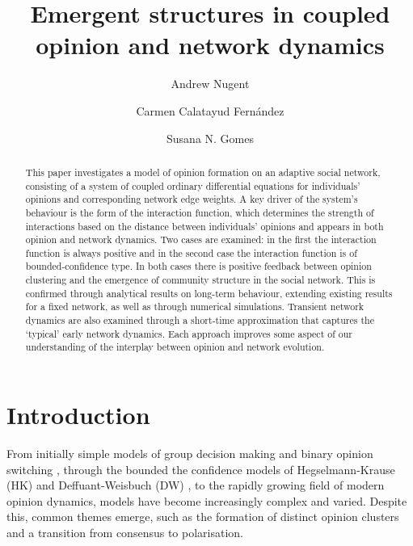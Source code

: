 \documentclass{article}
\title{Emergent structures in coupled opinion and network dynamics}
\author[1,2]{Andrew Nugent}
\author[3]{Carmen Calatayud Fern\'andez}
\author[2]{Susana N. Gomes}
\affil[1]{Department of Mathematics, University College London}
\affil[2]{Mathematics Institute, University of Warwick}
\affil[3]{Department of Physics, University of Warwick}
\begin{document}
\maketitle

\begin{abstract}
    This paper investigates a model of opinion formation on an adaptive social network, consisting of a system of coupled ordinary differential equations for individuals' opinions and corresponding network edge weights. A key driver of the system's behaviour is the form of the interaction function, which determines the strength of interactions based on the distance between individuals' opinions and appears in both opinion and network dynamics. Two cases are examined: in the first the interaction function is always positive and in the second case the interaction function is of bounded-confidence type. In both cases there is positive feedback between opinion clustering and the emergence of community structure in the social network. This is confirmed through analytical results on long-term behaviour, extending existing results for a fixed network, as well as through numerical simulations. Transient network dynamics are also examined through a short-time approximation that captures the `typical' early network dynamics. Each approach improves some aspect of our understanding of the interplay between opinion and network evolution. 
\end{abstract}

\tableofcontents

\newpage

\section{Introduction} \label{Section: Introduction}

From initially simple models of group decision making \cite{degroot1974reaching} and binary opinion switching \cite{liggett1985interacting}, through the bounded the confidence models of Hegselmann-Krause (HK) \cite{hegselmann2002opinion} and Deffuant-Weisbuch (DW) \cite{deffuant2000mixing}, to the rapidly growing field of modern opinion dynamics, models have become increasingly complex and varied. Despite this, common themes emerge, such as the formation of distinct opinion clusters and a transition from consensus to polarisation. 
\end{document}
